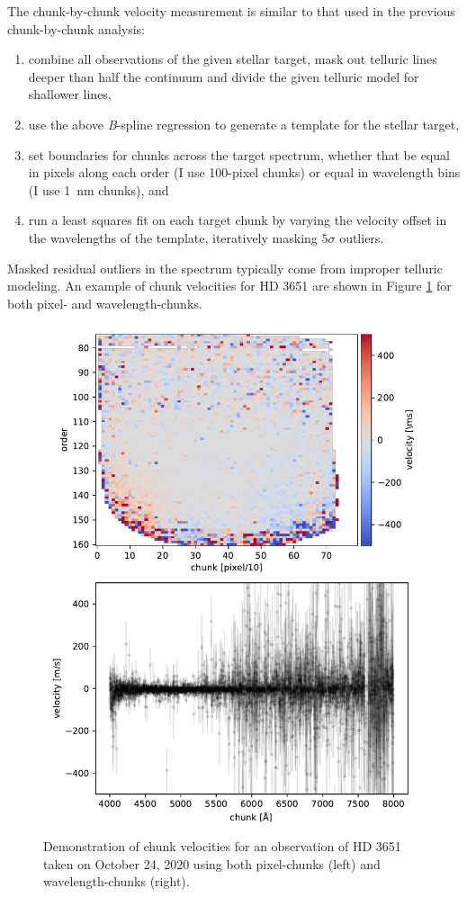 The chunk-by-chunk velocity measurement is similar to that used in the previous chunk-by-chunk analysis:
\begin{enumerate}
    \item combine all observations of the given stellar target, mask out telluric lines deeper than half the continuum and divide the given telluric model for shallower lines,
    \item use the above \textit{B}-spline regression to generate a template for the stellar target,
    \item set boundaries for chunks across the target spectrum, whether that be equal in pixels along each order (I use 100-pixel chunks) or equal in wavelength bins (I use 1~nm chunks), and
    \item run a least squares fit on each target chunk by varying the velocity offset in the wavelengths of the template, iteratively masking $5\sigma$ outliers.
\end{enumerate}
Masked residual outliers in the spectrum typically come from improper telluric modeling. An example of chunk velocities for HD 3651 are shown in Figure \ref{fig:chunk-vels} for both pixel- and wavelength-chunks.

\begin{figure}
    \centering
    \includegraphics{figures-5/chunk-vels.pdf}
    \caption{Demonstration of chunk velocities for an observation of HD 3651 taken on October 24, 2020 using both pixel-chunks (left) and wavelength-chunks (right).}
    \label{fig:chunk-vels}
\end{figure}

